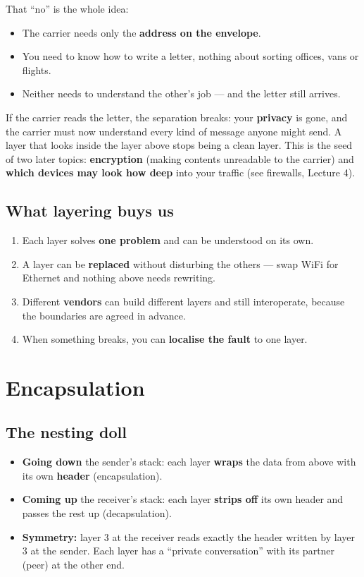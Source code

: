 That ``no'' is the whole idea:
\begin{itemize}
  \item The carrier needs only the \textbf{address on the envelope}.
  \item You need to know how to write a letter, nothing about sorting offices, vans or flights.
  \item Neither needs to understand the other's job --- and the letter still arrives.
\end{itemize}

\begin{analogy}
If the carrier reads the letter, the separation breaks: your \textbf{privacy} is gone, and the carrier must now understand every kind of message anyone might send. A layer that looks inside the layer above stops being a clean layer. This is the seed of two later topics: \textbf{encryption} (making contents unreadable to the carrier) and \textbf{which devices may look how deep} into your traffic (see firewalls, Lecture 4).
\end{analogy}

\subsection{What layering buys us}
\begin{enumerate}
  \item Each layer solves \textbf{one problem} and can be understood on its own.
  \item A layer can be \textbf{replaced} without disturbing the others --- swap WiFi for Ethernet and nothing above needs rewriting.
  \item Different \textbf{vendors} can build different layers and still interoperate, because the boundaries are agreed in advance.
  \item When something breaks, you can \textbf{localise the fault} to one layer.
\end{enumerate}

\section{Encapsulation}

\subsection{The nesting doll}
\begin{itemize}
  \item \textbf{Going down} the sender's stack: each layer \textbf{wraps} the data from above with its own \textbf{header} (encapsulation).
  \item \textbf{Coming up} the receiver's stack: each layer \textbf{strips off} its own header and passes the rest up (decapsulation).
  \item \textbf{Symmetry:} layer 3 at the receiver reads exactly the header written by layer 3 at the sender. Each layer has a ``private conversation'' with its partner (peer) at the other end.
\end{itemize}

